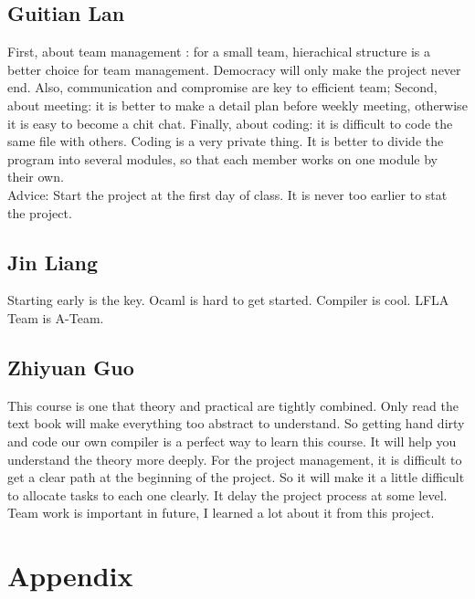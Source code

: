 \documentclass[12pt]{article} %
\begin{document}
\subsection{Guitian Lan}
\noindent First, about team management : for a small team,  hierachical structure is a better choice for team management. Democracy will only make the project never end. Also, communication and compromise are key to efficient team; Second, about meeting: it is better to make a detail plan before weekly meeting, otherwise it is easy to become a chit chat. Finally, about coding:  it is difficult to code the same file with others. Coding is a very private thing. It is better to divide the program into several modules, so that each member works on one module by their own.   \\
Advice: Start the project at the first day of class. It is never too earlier to stat the project. 
\subsection{Jin Liang}
\noindent Starting early is the key. Ocaml is hard to get started. Compiler is cool. LFLA Team is A-Team.
\subsection{Zhiyuan Guo}
\noindent This course is one that theory and practical are tightly combined. Only read the text book will make everything too abstract to understand. So getting hand dirty and code our own compiler is a perfect way to learn this course. It will help you understand the theory more deeply. For the project management, it is difficult to get a clear path at the beginning of the project. So it will make it a little difficult to allocate tasks to each one clearly. It delay the project process at some level. Team work is important in future, I learned a lot about it from this project.

\section{Appendix}
\end{document}
